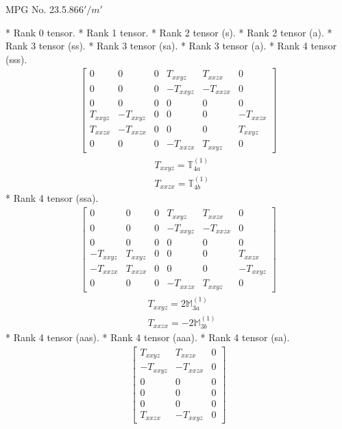 \documentclass[fleqn,8pt,landscape]{jsarticle}
\begin{document}
\setcounter{MaxMatrixCols}{32}

\renewcommand{\tablename}{Table~}
\renewcommand{\figurename}{Figure~}
\begin{center}
\LARGE
MPG No. 23.5.86\quad$6'/m'$
\end{center}
* Rank 0 tensor.
* Rank 1 tensor.
* Rank 2 tensor (s).
* Rank 2 tensor (a).
* Rank 3 tensor (ss).
* Rank 3 tensor (sa).
* Rank 3 tensor (a).
* Rank 4 tensor (sss).
\begin{align*}
\begin{bmatrix} 0 & 0 & 0 & T_{xxyz} & T_{xxzx} & 0 \\ 0 & 0 & 0 & - T_{xxyz} & - T_{xxzx} & 0 \\ 0 & 0 & 0 & 0 & 0 & 0 \\ T_{xxyz} & - T_{xxyz} & 0 & 0 & 0 & - T_{xxzx} \\ T_{xxzx} & - T_{xxzx} & 0 & 0 & 0 & T_{xxyz} \\ 0 & 0 & 0 & - T_{xxzx} & T_{xxyz} & 0 \end{bmatrix}
\end{align*}
\begin{align*}
& T_{xxyz} = \mathbb{T}_{4a}^{(1)} \\
& T_{xxzx} = \mathbb{T}_{4b}^{(1)}
\end{align*}
* Rank 4 tensor (ssa).
\begin{align*}
\begin{bmatrix} 0 & 0 & 0 & T_{xxyz} & T_{xxzx} & 0 \\ 0 & 0 & 0 & - T_{xxyz} & - T_{xxzx} & 0 \\ 0 & 0 & 0 & 0 & 0 & 0 \\ - T_{xxyz} & T_{xxyz} & 0 & 0 & 0 & T_{xxzx} \\ - T_{xxzx} & T_{xxzx} & 0 & 0 & 0 & - T_{xxyz} \\ 0 & 0 & 0 & - T_{xxzx} & T_{xxyz} & 0 \end{bmatrix}
\end{align*}
\begin{align*}
& T_{xxyz} = 2 \mathbb{M}_{3a}^{(1)} \\
& T_{xxzx} = - 2 \mathbb{M}_{3b}^{(1)}
\end{align*}
* Rank 4 tensor (aas).
* Rank 4 tensor (aaa).
* Rank 4 tensor (sa).
\begin{align*}
\begin{bmatrix} T_{xxyz} & T_{xxzx} & 0 \\ - T_{xxyz} & - T_{xxzx} & 0 \\ 0 & 0 & 0 \\ 0 & 0 & 0 \\ 0 & 0 & 0 \\ T_{xxzx} & - T_{xxyz} & 0 \end{bmatrix}
\end{align*}
\end{document}
